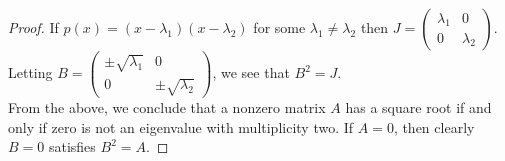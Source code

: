 \documentclass[../AlgebraQualSolutions.tex]{subfiles}
\begin{document}
\begin{proof}
    If $p(x) = (x-\lambda_1)(x-\lambda_2)$ for some $\lambda_1 \neq \lambda_2$ then $J = \begin{pmatrix} \lambda_1 & 0\\ 0 & \lambda_2 \end{pmatrix}$. Letting $B = \begin{pmatrix} \pm \sqrt{\lambda_1} & 0\\ 0 & \pm\sqrt{\lambda_2} \end{pmatrix}$, we see that $B^2 = J$.\\

    From the above, we conclude that a nonzero matrix $A$ has a square root if and only if zero is not an eigenvalue with multiplicity two. If $A = 0$, then clearly $B = 0$ satisfies $B^2 = A$.
\end{proof}
\end{document}
